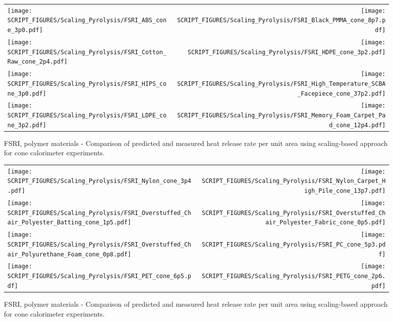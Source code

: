 \begin{figure}[p]
\begin{tabular*}{\textwidth}{l@{\extracolsep{\fill}}r}
\texttt{[image: SCRIPT\_FIGURES/Scaling\_Pyrolysis/FSRI\_ABS\_cone\_3p0.pdf]} &
\texttt{[image: SCRIPT\_FIGURES/Scaling\_Pyrolysis/FSRI\_Black\_PMMA\_cone\_8p7.pdf]} \\
\texttt{[image: SCRIPT\_FIGURES/Scaling\_Pyrolysis/FSRI\_Cotton\_Raw\_cone\_2p4.pdf]} &
\texttt{[image: SCRIPT\_FIGURES/Scaling\_Pyrolysis/FSRI\_HDPE\_cone\_3p2.pdf]} \\
\texttt{[image: SCRIPT\_FIGURES/Scaling\_Pyrolysis/FSRI\_HIPS\_cone\_3p0.pdf]} &
\texttt{[image: SCRIPT\_FIGURES/Scaling\_Pyrolysis/FSRI\_High\_Temperature\_SCBA\_Facepiece\_cone\_37p2.pdf]} \\
\texttt{[image: SCRIPT\_FIGURES/Scaling\_Pyrolysis/FSRI\_LDPE\_cone\_3p2.pdf]} &
\texttt{[image: SCRIPT\_FIGURES/Scaling\_Pyrolysis/FSRI\_Memory\_Foam\_Carpet\_Pad\_cone\_12p4.pdf]} \\
\end{tabular*}
\caption[HRRPUA of FSRI Materials using scaling model, polymer materials]
{FSRI, polymer materials - Comparison of predicted and measured heat release rate per unit area using scaling-based approach for cone calorimeter experiments.}
\label{FSRI_Materials_HRR_Polymers1}
\end{figure}

\begin{figure}[p]
\begin{tabular*}{\textwidth}{l@{\extracolsep{\fill}}r}
\texttt{[image: SCRIPT\_FIGURES/Scaling\_Pyrolysis/FSRI\_Nylon\_cone\_3p4.pdf]} &
\texttt{[image: SCRIPT\_FIGURES/Scaling\_Pyrolysis/FSRI\_Nylon\_Carpet\_High\_Pile\_cone\_13p7.pdf]} \\
\texttt{[image: SCRIPT\_FIGURES/Scaling\_Pyrolysis/FSRI\_Overstuffed\_Chair\_Polyester\_Batting\_cone\_1p5.pdf]} &
\texttt{[image: SCRIPT\_FIGURES/Scaling\_Pyrolysis/FSRI\_Overstuffed\_Chair\_Polyester\_Fabric\_cone\_0p5.pdf]} \\
\texttt{[image: SCRIPT\_FIGURES/Scaling\_Pyrolysis/FSRI\_Overstuffed\_Chair\_Polyurethane\_Foam\_cone\_0p8.pdf]} &
\texttt{[image: SCRIPT\_FIGURES/Scaling\_Pyrolysis/FSRI\_PC\_cone\_5p3.pdf]} \\
\texttt{[image: SCRIPT\_FIGURES/Scaling\_Pyrolysis/FSRI\_PET\_cone\_6p5.pdf]} &
\texttt{[image: SCRIPT\_FIGURES/Scaling\_Pyrolysis/FSRI\_PETG\_cone\_2p6.pdf]} \\
\end{tabular*}
\caption[HRRPUA of FSRI Materials using scaling model, polymer materials]
{FSRI, polymer materials - Comparison of predicted and measured heat release rate per unit area using scaling-based approach for cone calorimeter experiments.}
\label{FSRI_Materials_HRR_Polymers2}
\end{figure}

